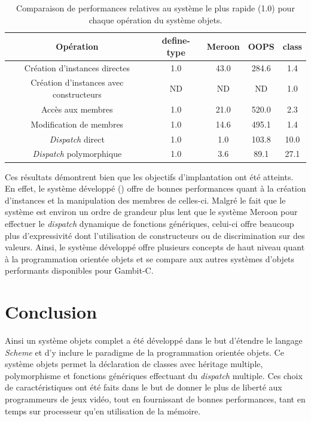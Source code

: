 \documentclass[12pt,twoside,letterpaper,francais]{book}
\newcommand{\Schemelang}{{\textit{Scheme }}}
\newcommand{\scheme}[1]{\selectlanguage{english}{\tt #1}\selectlanguage{french}}
\begin{document}
\begin{table}
  \center
  \begin{tabular}{ccccc}
    \hline
    Opération & define-type & Meroon & OOPS & class \\
    \hline \hline
    Création d'instances directes & 1.0 & 43.0 & 284.6 & 1.4 \\
    Création d'instances avec constructeurs & ND & ND & ND & 1.0 \\
    Accès aux membres & 1.0 & 21.0 & 520.0 & 2.3 \\
    Modification de membres & 1.0 & 14.6 & 495.1 & 1.4 \\
    \textit{Dispatch} direct & 1.0 & 1.0 & 103.8 & 10.0 \\
    \textit{Dispatch} polymorphique & 1.0 & 3.6 & 89.1 & 27.1 \\
    \hline
  \end{tabular}
  \caption{Comparaison de performances relatives au système le plus
    rapide (1.0) pour chaque opération du système objets.}
  \label{OO:bench-rel}
\end{table}

Ces résultats démontrent bien que les objectifs d'implantation ont été
atteints. En effet, le système développé (\scheme{class}) offre de
bonnes performances quant à la création d'instances et la manipulation
des membres de celles-ci. Malgré le fait que le système est environ un
ordre de grandeur plus lent que le système Meroon pour effectuer le
\textit{dispatch} dynamique de fonctions génériques, celui-ci offre
beaucoup plus d'expressivité dont l'utilisation de constructeurs ou de
discrimination sur des valeurs. Ainsi, le système développé offre
plusieurs concepts de haut niveau quant à la programmation orientée
objets et se compare aux autres systèmes d'objets performants
disponibles pour Gambit-C.

\FloatBarrier
\section{Conclusion}
Ainsi un système objets complet a été développé dans le but d'étendre
le langage \Schemelang et d'y inclure le paradigme de la programmation
orientée objets. Ce système objets permet la déclaration de classes avec
héritage multiple, polymorphisme et fonctions génériques effectuant du
\textit{dispatch} multiple. Ces choix de caractéristiques ont été
faits dans le but de donner le plus de liberté aux programmeurs de
jeux vidéo, tout en fournissant de bonnes performances, tant en temps
sur processeur qu'en utilisation de la mémoire.
\end{document}

